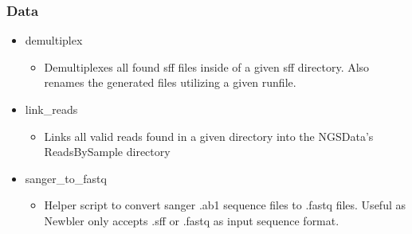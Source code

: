 \documentclass{article}
\begin{document}
\subsubsection{Data}
 \begin{itemize}
  \item demultiplex
   \begin{itemize}
    \item Demultiplexes all found sff files inside of a given sff directory. Also renames the generated files utilizing a given runfile.
   \end{itemize}
  \item link\_reads
   \begin{itemize}
    \item Links all valid reads found in a given directory into the NGSData's ReadsBySample directory
   \end{itemize}
  \item sanger\_to\_fastq
   \begin{itemize}
    \item Helper script to convert sanger .ab1 sequence files to .fastq files. Useful as Newbler only accepts .sff or .fastq as input sequence format.
   \end{itemize}
 \end{itemize}
\end{document}
